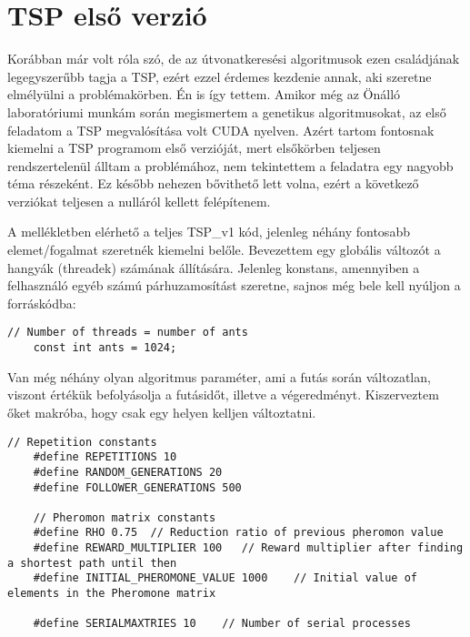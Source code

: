 \section{TSP első verzió \label{TSP_v1_SubSection}}
Korábban már volt róla szó, de az útvonatkeresési algoritmusok ezen családjának legegyszerűbb tagja a TSP, ezért ezzel érdemes kezdenie annak, aki szeretne elmélyülni a problémakörben. Én is így tettem. Amikor még az Önálló laboratóriumi munkám során megismertem a genetikus algoritmusokat, az első feladatom a TSP megvalósítása volt CUDA nyelven. Azért tartom fontosnak kiemelni a TSP programom első verzióját, mert elsőkörben teljesen rendszertelenül álltam a problémához, nem tekintettem a feladatra egy nagyobb téma részeként. Ez később nehezen bővithető lett volna, ezért a következő verziókat teljesen a nulláról kellett felépítenem.

A mellékletben elérhető a teljes TSP\_v1 kód, jelenleg néhány fontosabb elemet/fogalmat szeretnék kiemelni belőle.
Bevezettem egy globális változót a hangyák (threadek) számának állítására. Jelenleg konstans, amennyiben a felhasználó egyéb számú párhuzamosítást szeretne, sajnos még bele kell nyúljon a forráskódba:

\begin{lstlisting}[style=CStyle]
	// Number of threads = number of ants
	const int ants = 1024;
\end{lstlisting}

Van még néhány olyan algoritmus paraméter, ami a futás során változatlan, viszont értékük befolyásolja a futásidőt, illetve a végeredményt. Kiszerveztem őket makróba, hogy csak egy helyen kelljen változtatni.

\begin{lstlisting}[style=CStyle]
	// Repetition constants
	#define REPETITIONS 10
	#define RANDOM_GENERATIONS 20
	#define FOLLOWER_GENERATIONS 500
	
	// Pheromon matrix constants
	#define RHO 0.75  // Reduction ratio of previous pheromon value
	#define REWARD_MULTIPLIER 100   // Reward multiplier after finding a shortest path until then
	#define INITIAL_PHEROMONE_VALUE 1000    // Initial value of elements in the Pheromone matrix
	
	#define SERIALMAXTRIES 10    // Number of serial processes
\end{lstlisting}

